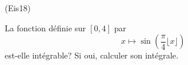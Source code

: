 \begin{tiny}(Eis18)\end{tiny} La fonction définie sur $[0,4]$ par 
\begin{displaymath}
 x\mapsto \sin(\frac{\pi}{4}\lfloor x \rfloor)
\end{displaymath}
 est-elle intégrable? Si oui, calculer son intégrale. 